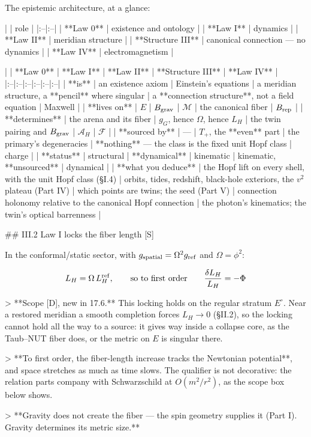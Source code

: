 The epistemic architecture, at a glance:

| | role |
|:--|:--|
| **Law 0** | existence and ontology |
| **Law I** | dynamics |
| **Law II** | meridian structure |
| **Structure III** | canonical connection — no dynamics |
| **Law IV** | electromagnetism |


| | **Law 0** | **Law I** | **Law II** | **Structure III** | **Law IV** |
|:--|:--|:--|:--|:--|:--|
| **is** | an existence axiom | Einstein's equations | a meridian structure, a **pencil** where singular | a **connection structure**, not a field equation | Maxwell |
| **lives on** | $E$ | $B_{\rm grav}$ | $\mathcal{M}$ | the canonical fiber | $B_{\rm rep}$ |
| **determines** | the arena and its fiber | $g_G$, hence $\Omega$, hence $L_H$ | the twin pairing and $B_{\rm grav}$ | $\mathcal{A}_H$ | $\mathcal{F}$ |
| **sourced by** | — | $T_+$, the **even** part | the primary's degeneracies | **nothing** — the class is the fixed unit Hopf class | charge |
| **status** | structural | **dynamical** | kinematic | kinematic, **unsourced** | dynamical |
| **what you deduce** | the Hopf lift on every shell, with the unit Hopf class (§I.4) | orbits, tides, redshift, black-hole exteriors, the $v^2$ plateau (Part IV) | which points are twins; the seed (Part V) | connection holonomy relative to the canonical Hopf connection | the photon's kinematics; the twin's optical barrenness |

## III.2 Law I locks the fiber length [S]

In the conformal/static sector, with $g_{\rm spatial} = \Omega^2g_{\rm ref}$ and $\Omega = \phi^2$:

$$L_H = \Omega\,L_H^{\rm ref},\qquad\text{so to first order}\qquad \frac{\delta L_H}{L_H} = -\Phi$$

> **Scope [D], new in 17.6.** This locking holds on the regular stratum $E^\circ$. Near a restored meridian a smooth completion forces $L_H\to0$ (§II.2), so the locking cannot hold all the way to a source: it gives way inside a collapse core, as the Taub–NUT fiber does, or the metric on $E$ is singular there.

> **To first order, the fiber-length increase tracks the Newtonian potential**, and space stretches as much as time slows. The qualifier is not decorative: the relation parts company with Schwarzschild at $O(m^2/r^2)$, as the scope box below shows.

> **Gravity does not create the fiber — the spin geometry supplies it (Part I). Gravity determines its metric size.**

